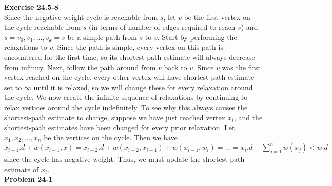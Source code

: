 \documentclass{article}
\begin{document}
\noindent\textbf{Exercise 24.5-8}\\

Since the negative-weight cycle is reachable from $s$, let $v$ be the first vertex on the cycle reachable from $s$ (in terms of number of edges required to reach $v$) and $s = v_0, v_1, \ldots, v_k = v$ be a simple path from $s$ to $v$.  Start by performing the relaxations to $v$. Since the path is simple, every vertex on this path is encountered for the first time, so its shortest path estimate will always decrease from infinity.  Next, follow the path around from $v$ back to $v$.  Since $v$ was the first vertex reached on the cycle, every other vertex will have shortest-path estimate set to $\infty$ until it is relaxed, so we will change these for every relaxation around the cycle.  We now create the infinite sequence of relaxations by continuing to relax vertices around the cycle indefinitely. To see why this always causes the shortest-path estimate to change, suppose we have just reached vertex $x_i$, and the shortest-path estimates have been changed for every prior relaxation.  Let $x_1, x_2, \ldots, x_n$ be the vertices on the cycle. Then we have $x_{i-1}.d + w(x_{i-1}, x) = x_{i-2}.d + w(x_{i-2}, x_{i-1}) + w(x_{i-1}, w_i) = \ldots = x_i.d + \sum_{j=1}^n w(x_j) < w.d$ since the cycle has negative weight.  Thus, we must update the shortest-path estimate of $x_i$.\\


\noindent\textbf{Problem 24-1}\\
\end{document}
